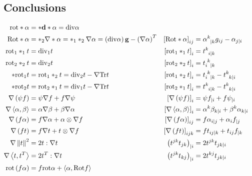 \documentclass[a4paper,7pt]{scrartcl}
\newcommand{\exd}{\mathbf{d}}
\newcommand{\Tr}{\mathrm{Tr}}
\newcommand{\rot}{\mathrm{rot}}
\renewcommand{\div}{\mathrm{div}}
\newcommand{\Rot}{\mathrm{Rot}}
\newcommand{\gb}{\mathbf{g}}
\begin{document}
  \subsection{Conclusions}
  \begin{align*}
    \rot*\alpha &= *\exd*\alpha = \div\alpha\\
    \Rot*\alpha &= *_{2}\nabla*\alpha = *_{1}*_{2}\nabla\alpha = \left( \div\alpha \right)\gb - \left( \nabla\alpha \right)^{T}
                & \left[ \Rot*\alpha  \right]_{ij} &= \tensor{\alpha}{^{k}_{|k}}g_{ij} - \alpha_{j|i}\\
    \rot_{1}*_{1}t &= \div_{1} t
                &\left[ \rot_{1}*_{1}t \right]_{i} &= \tensor{t}{^{k}_{i|k}}\\
    \rot_{2}*_{2}t &= \div_{2} t
                &\left[ \rot_{2}*_{2}t \right]_{i} &= \tensor{t}{_{i}^{k}_{|k}}\\
    *\rot_{1} t &= \rot_{1}*_{2}t = \div_{2} t - \nabla\Tr t
                &\left[ \rot_{1}*_{2}t \right]_{i} &= \tensor{t}{_{i}^{k}_{|k}} - \tensor{t}{^{k}_{k|i}}\\
    *\rot_{2} t &= \rot_{2}*_{1}t = \div_{1} t - \nabla\Tr t
                &\left[ \rot_{2}*_{1}t \right]_{i} &= \tensor{t}{^{k}_{i|k}} - \tensor{t}{^{k}_{k|i}}\\
    \nabla\left( \psi f \right) &= \psi\nabla f + f\nabla\psi
                &\left[ \nabla\left( \psi f \right) \right]_{i} &= \psi f_{|i} + f \psi_{|i}\\
    \nabla\left\langle \alpha, \beta \right\rangle &= \alpha\nabla\beta + \beta\nabla\alpha
                &\left[ \nabla\left\langle \alpha, \beta \right\rangle \right]_{i} &= \alpha^{k}\beta_{k|i} + \beta^{k}\alpha_{k|i}\\
    \nabla\left( f\alpha \right) &= f\nabla\alpha + \alpha\otimes\nabla f
                &\left[ \nabla\left( f\alpha \right) \right]_{ij} &= f\alpha_{i|j} + \alpha_{i}f_{|j}\\
    \nabla\left( f t \right) &= f\nabla t + t \otimes\nabla f
                &\left[ \nabla\left( f t \right) \right]_{ijk} &= f t_{ij|k} + t_{ij}f_{|k}\\
    \nabla\left\| t \right\|^{2} &= 2t:\nabla t
                &\left( t^{jk}t_{jk} \right)_{|i} &= 2t^{jk}t_{jk|i}\\
    \nabla\left\langle t , t^{T} \right\rangle &= 2t^{T}:\nabla t
                &\left( t^{jk}t_{kj} \right)_{|i} &= 2t^{kj}t_{jk|i}\\
    \rot\left( f\alpha \right) &= f\rot\alpha + \left\langle \alpha, \Rot f \right\rangle

\end{align*}
\end{document}
